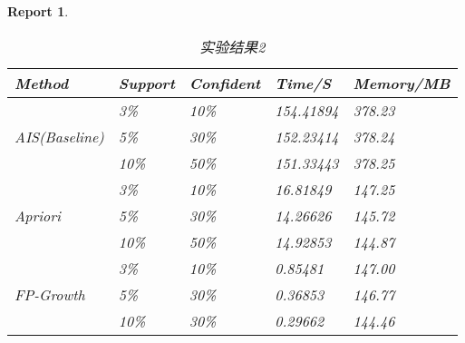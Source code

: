 \documentclass[a4paper,UTF8]{article}
\numberwithin{equation}{section}
\newtheorem*{mySol}{Report}
\begin{document}
\begin{mySol}
\begin{enumerate}
\begin{table}[H]
\centering
\caption{实验结果2}
\label{my-label}
\begin{tabular}{|l|l|l|l|l|}
\hline
Method                         & Support & Confident & Time/S   & Memory/MB \\ \hline
\multirow{3}{*}{AIS(Baseline)} & 3\%   & 10\%     & 154.41894 & 378.23    \\ \cline{2-5} 
                               & 5\%     & 30\%       & 152.23414 & 378.24    \\ \cline{2-5} 
                               & 10\%    & 50\%      & 151.33443 & 378.25    \\ \hline
\multirow{3}{*}{Apriori}       & 3\%  & 10\%    & 16.81849 & 147.25    \\ \cline{2-5} 
                               & 5\%     & 30\%       & 14.26626 & 145.72    \\ \cline{2-5} 
                               & 10\%    & 50\%      & 14.92853 & 144.87    \\ \hline
\multirow{3}{*}{FP-Growth}     & 3\%  & 10\%     & 0.85481  & 147.00    \\ \cline{2-5} 
                               & 5\%     & 30\%       & 0.36853  & 146.77    \\ \cline{2-5} 
                               & 10\%    & 30\%      & 0.29662  & 144.46    \\ \hline
\end{tabular}
\end{table}



\end{enumerate}
\end{mySol}
\end{document}
